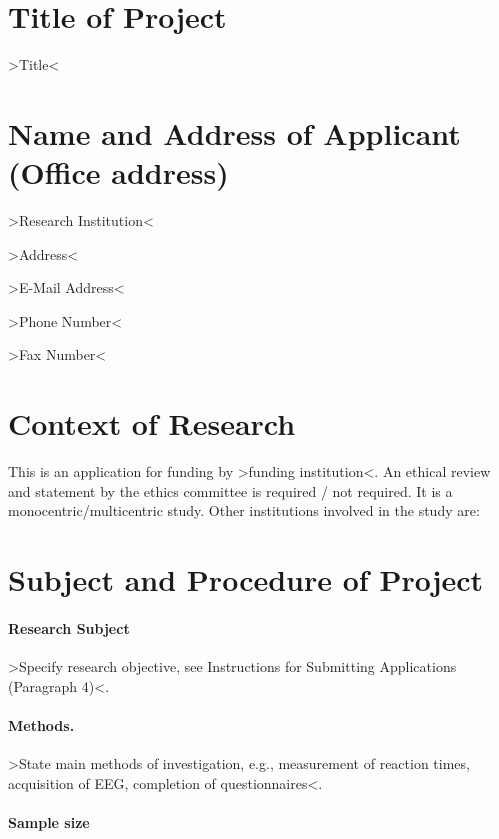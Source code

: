 \documentclass[11pt,twoside,a4paper]{article}
\begin{document}
\maketitle
\thispagestyle{fancy}

\section{Title of Project}

>Title<

\section{Name and Address of Applicant (Office address)}

>Research Institution<

>Address<

>E-Mail Address<

>Phone Number<

>Fax Number<

\section{Context of Research}

This is an application for funding by >funding institution<.
An ethical review and statement by the ethics committee is required / not required.
It is a monocentric/multicentric study.
Other institutions involved in the study are:

\section{Subject and Procedure of Project}

\paragraph{Research Subject}

>Specify research objective, see Instructions for Submitting Applications (Paragraph 4)<.

\paragraph{Methods.}

>State main methods of investigation, e.g., measurement of reaction times, acquisition of EEG, completion of questionnaires<.

\paragraph{Sample size}
\end{document}
